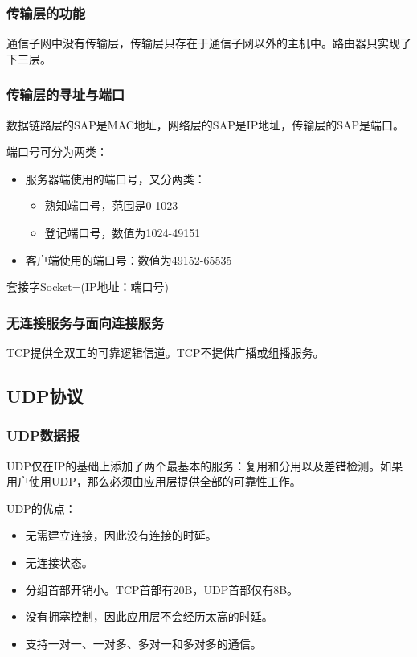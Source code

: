 \documentclass[12pt, a4paper, oneside]{ctexart}
\begin{document}
\subsubsection{传输层的功能}

通信子网中没有传输层，传输层只存在于通信子网以外的主机中。路由器只实现了下三层。

\subsubsection{传输层的寻址与端口}

数据链路层的SAP是MAC地址，网络层的SAP是IP地址，传输层的SAP是端口。

端口号可分为两类：
\begin{itemize}
    \item 服务器端使用的端口号，又分两类：
    \begin{itemize}
        \item 熟知端口号，范围是0-1023
        \item 登记端口号，数值为1024-49151
    \end{itemize}
    \item 客户端使用的端口号：数值为49152-65535
\end{itemize}

套接字Socket=(IP地址：端口号)

\subsubsection{无连接服务与面向连接服务}

TCP提供全双工的可靠逻辑信道。TCP不提供广播或组播服务。

\subsection{UDP协议}

\subsubsection{UDP数据报}

UDP仅在IP的基础上添加了两个最基本的服务：复用和分用以及差错检测。如果用户使用UDP，那么必须由应用层提供全部的可靠性工作。

UDP的优点：
\begin{itemize}
    \item 无需建立连接，因此没有连接的时延。
    \item 无连接状态。
    \item 分组首部开销小。TCP首部有20B，UDP首部仅有8B。
    \item 没有拥塞控制，因此应用层不会经历太高的时延。
    \item 支持一对一、一对多、多对一和多对多的通信。
\end{itemize}
\end{document}
